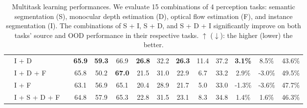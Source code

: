 \begin{table*}[t]
\begin{tabular}{@{}lllcccccccc|ccc@{}}
                                                                                        & I + D                  &                                                                           & \textbf{65.9}                       & \textbf{59.3}   & 66.9              & \textbf{26.8}  & 32.2          & \textbf{26.3}      & 11.4           & 37.2                                         & \textbf{3.1\%}                                & 8.5\%                                      & 43.6\%                                     \\
                                                                                        & I + D + F              &                                                                           & 65.8                                & 50.2            & \textbf{67.0}     & 21.5           & 31.0          & 22.9               & 6.7            & 33.2                                         & 2.9\%                                         & -3.0\%                                     & 49.5\%                                     \\
                                                                                        & I + F                  &                                                                           & 63.1                                & 56.9            & 65.1              & 20.4           & 28.9          & 21.7               & 5.0            & 33.0                                         & -1.3\%                                        & -3.6\%                                     & 47.7\%                                     \\
                                                                                        & I + S + D + F          &                                                                           & 64.8                                & 57.9            & 65.3              & 22.8           & 31.5          & 23.1               & 8.3            & 34.8                                         & 1.4\%                                         & 1.6\%                                      & 46.3\%                                     \\ \bottomrule
\end{tabular}
\caption{Multitask learning performances. We evaluate 15 combinations of 4 perception tasks: semantic segmentation (S), monocular depth estimation (D), optical flow estimation (F), and instance segmentation (I). The combinations of S + I, S + D, and S + D + I significantly improve on both tasks' source and OOD performance in their respective tasks. $\uparrow$ ($\downarrow$): the higher (lower) the better.}

\end{table*}
